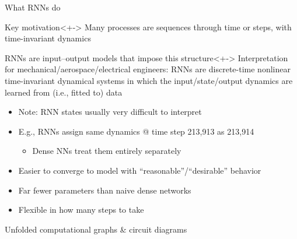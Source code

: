 \begin{frame}{What RNNs do}
    \begin{block}{Key motivation}<+->
        Many processes are sequences through \alert{time} or \alert{steps}, with \alert{time-invariant dynamics}
    \end{block}

    \begin{block}{RNN{}s are input--output models that impose this structure}<+->
        Interpretation for mechanical/aerospace/electrical engineers: RNNs are \alert{discrete-time nonlinear time-invariant dynamical systems} in which the input/state/output dynamics are learned from (i.e., fitted to) data
    \end{block}

    \begin{itemize}
        \item Note: RNN states usually very difficult to interpret
        \item E.g., RNN{}s assign same dynamics @ time step 213,913 as 213,914
        \begin{itemize}
            \item Dense NN{}s treat them entirely separately
        \end{itemize}
        \item Easier to converge to model with ``reasonable''/``desirable'' behavior
        \item Far fewer parameters than naive dense networks
        \item Flexible in how many steps to take
    \end{itemize}
\end{frame}

\begin{frame}{Unfolded computational graphs \& circuit diagrams}
    
\end{frame}

